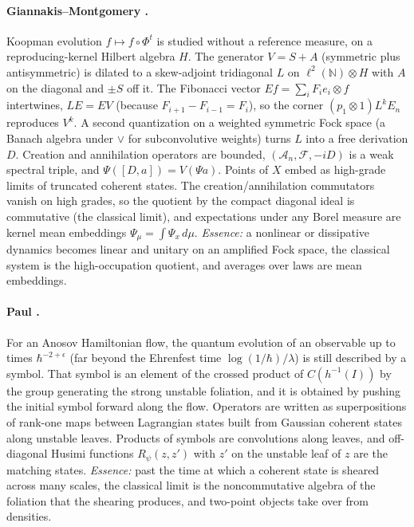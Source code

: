\paragraph{Giannakis--Montgomery \cite{GM}.} Koopman evolution $f\mapsto f\circ\Phi^t$ is studied without a reference measure, on a
reproducing-kernel Hilbert algebra $H$. The generator $V=S+A$ (symmetric plus antisymmetric) is dilated to a skew-adjoint tridiagonal
$L$ on $\ell^2(\mathbb N)\otimes H$ with $A$ on the diagonal and $\pm S$ off it. The Fibonacci vector $E f=\sum_iF_ie_i\otimes f$ intertwines,
$LE=EV$ (because $F_{i+1}-F_{i-1}=F_i$), so the corner $(p_1\otimes1)L^kE_n$ reproduces $V^k$. A second quantization on a weighted
symmetric Fock space (a Banach algebra under $\vee$ for subconvolutive weights) turns $L$ into a free derivation $D$. Creation and
annihilation operators are bounded, $(\mathcal A_n,\mathcal F,-iD)$ is a weak spectral triple, and $\Psi([D,a])=V(\Psi a)$. Points of $X$
embed as high-grade limits of truncated coherent states. The creation/annihilation commutators vanish on high grades, so the quotient
by the compact diagonal ideal is commutative (the classical limit), and expectations under any Borel measure are kernel mean embeddings
$\Psi_\mu=\int\Psi_x\,d\mu$. \emph{Essence:} a nonlinear or dissipative dynamics becomes linear and unitary on an amplified Fock space, the
classical system is the high-occupation quotient, and averages over laws are mean embeddings.

\paragraph{Paul \cite{Paul}.} For an Anosov Hamiltonian flow, the quantum evolution of an observable up to times $\hbar^{-2+\epsilon}$
(far beyond the Ehrenfest time $\log(1/\hbar)/\lambda$) is still described by a symbol. That symbol is an element of the crossed product of
$C(h^{-1}(I))$ by the group generating the strong unstable foliation, and it is obtained by pushing the initial symbol forward along
the flow. Operators are written as superpositions of rank-one maps between Lagrangian states built from Gaussian coherent states
along unstable leaves. Products of symbols are convolutions along leaves, and off-diagonal Husimi functions $R_\psi(z,z')$ with $z'$ on
the unstable leaf of $z$ are the matching states. \emph{Essence:} past the time at which a coherent state is sheared across many
scales, the classical limit is the noncommutative algebra of the foliation that the shearing produces, and two-point objects take over
from densities.

